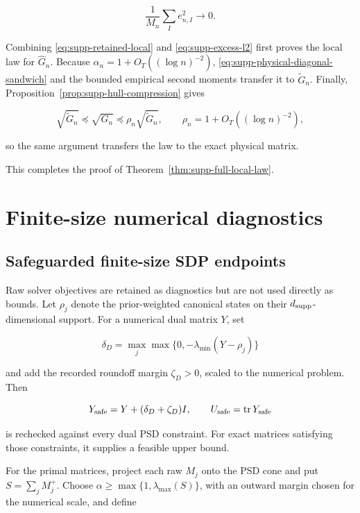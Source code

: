\begin{equation}\label{eq:supp-excess-l2}
 \frac1{M_n}\sum_Ie_{n,I}^2\longrightarrow0.
\end{equation}

Combining \eqref{eq:supp-retained-local} and
\eqref{eq:supp-excess-l2} first proves the local law for \(\widehat G_n\).
Because \(\alpha_n=1+O_T((\log n)^{-2})\),
\eqref{eq:supp-physical-diagonal-sandwich} and the bounded empirical second
moments transfer it to \(\widetilde G_n\).  Finally,
Proposition~\ref{prop:supp-hull-compression} gives

\[
 \sqrt{\widetilde G_n}\preceq\sqrt{G_n}
 \preceq\rho_n\sqrt{\widetilde G_n},
 \qquad \rho_n=1+O_T((\log n)^{-2}),
\]

so the same argument transfers the law to the exact physical matrix.

This completes the proof of Theorem~\ref{thm:supp-full-local-law}.

\section{Finite-size numerical diagnostics}
\label{supp:numerics}

\subsection{Safeguarded finite-size SDP endpoints}

Raw solver objectives are retained as diagnostics but are not used directly as
bounds. Let \(\rho_j\) denote the prior-weighted canonical states on their
\(d_{\rm supp}\)-dimensional support. For a numerical dual matrix \(Y\), set

\[
\delta_D=\max_j\max\{0,-\lambda_{\min}(Y-\rho_j)\}
\]

and add the recorded roundoff margin \(\zeta_D>0\), scaled to the numerical
problem. Then

\begin{equation}\label{eq:safe-dual-bound}
Y_{\rm safe}=Y+(\delta_D+\zeta_D)I,\qquad
U_{\rm safe}=\operatorname{tr}Y_{\rm safe}
\end{equation}

is rechecked against every dual PSD constraint. For exact matrices satisfying
those constraints, it supplies a feasible upper bound.

For the primal matrices, project each raw \(M_j\) onto the PSD cone and put
\(S=\sum_jM_j^+\). Choose
\(\alpha\geq\max\{1,\lambda_{\max}(S)\}\), with an outward margin chosen for
the numerical scale,
and define

